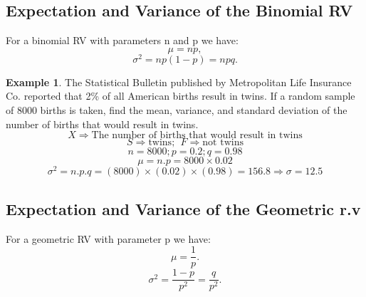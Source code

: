 \documentclass[12pt]{article}
\theoremstyle{definition}
\newtheorem{exmp}{Example}[section]
\begin{document}
\subsection{Expectation and Variance of the Binomial RV}
For a binomial RV with parameters n and p we have:
\[
    \mu = np, 
\]
\[
    \sigma^2 = np(1-p) = npq.
\]
\begin{exmp}
    The Statistical Bulletin published by Metropolitan Life Insurance Co.
    reported that 2\% of all American births result in twins. If a random
    sample of 8000 births is taken, find the mean, variance, and standard
    deviation of the number of births that would result in twins.
    \[
        X \Rightarrow \text{The number of births that would result in twins}
    \]
    \[
        S \Rightarrow \text{twins}; \ \ F \Rightarrow \text{not twins}
    \]
    \[
        n = 8000; p = 0.2; q = 0.98 
    \]
    \[
        \mu = n.p = 8000 \times 0.02 
    \]
    \[
        \sigma^2 = n.p.q = (8000) \times (0.02) \times (0.98) = 156.8 \Rightarrow \sigma = 12.5
    \]
\end{exmp}    
\subsection{Expectation and Variance of the Geometric r.v}
For a geometric RV with parameter p we have:
\[
    \mu = \frac{1}{p}.
\]
\[
    \sigma^2 = \frac{1-p}{p^2} = \frac{q}{p^2}.
\]
\end{document}
